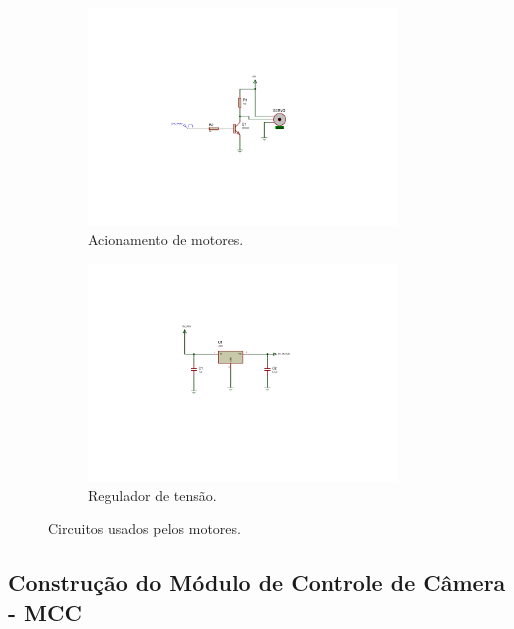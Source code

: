 \begin{figure}[H]
	\centering
	\begin{subfigure}{.5\textwidth}
		\includegraphics[trim={6.5cm 5cm 9cm 5cm},clip,width=0.9\textwidth]{figuras/circ_acionamento.pdf}
		\caption{Acionamento de motores.}
		\label{fig:circprotecao}
	\end{subfigure}%
	\begin{subfigure}{.5\textwidth}
		\includegraphics[trim={6.5cm 5cm 8.5cm 4cm},clip,width=0.9\textwidth]{figuras/fonte_motores.pdf}
		\caption{Regulador de tensão.}
		\label{fig:circfonte}
	\end{subfigure}
	\caption{Circuitos usados pelos motores.}
\end{figure}

\subsection{Construção do Módulo de Controle de Câmera - MCC}
\label{subsec:assemmodconcam}

